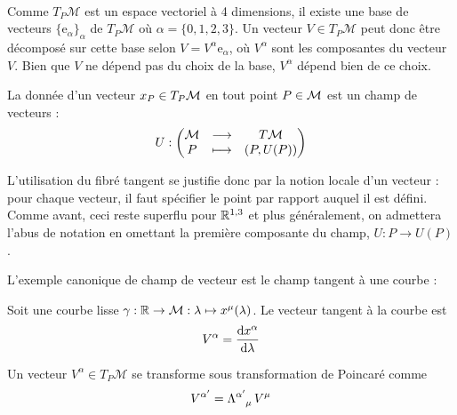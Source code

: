 {\begin{theoremframe}
\begin{defi}
\begin{align}
        \end{align}
    \end{defi}
\end{theoremframe}
Comme $T_P\mathcal{M}$ est un espace vectoriel à 4 dimensions, il existe une base de vecteurs $\{\mathrm{e}_\alpha\}_\alpha$ de $T_P\mathcal{M}$ où $\alpha = \{0,1,2,3\}$. Un vecteur $V \in T_P\mathcal{M}$ peut donc être décomposé sur cette base selon $V = V^\alpha \mathrm{e}_\alpha$, où $V^\alpha$ sont les composantes du vecteur $V$. Bien que $V$ ne dépend pas du choix de la base, $V^\alpha$ dépend bien de ce choix.
\begin{theoremframe}
    \begin{defi}
        La donnée d'un vecteur $x_P \in T_P\mathcal{M}$ en tout point $P \in \mathcal{M}$ est un champ de vecteurs :
        \begin{align*}
            U : \begin{pmatrix}
                \mathcal{M} & \longrightarrow& T\mathcal{M} \\
             P &\longmapsto&  (P,U(P))
            \end{pmatrix}
        \end{align*}
    \end{defi}
\end{theoremframe}
\begin{rmk}
    L'utilisation du fibré tangent se justifie donc par la notion locale d'un vecteur : pour chaque vecteur, il faut spécifier le point par rapport auquel il est défini. Comme avant, ceci reste superflu pour $\mathbb{R}^{1,3}$ et plus généralement, on admettera l'abus de notation en omettant la première composante du champ, $U: P \to U(P)$.
\end{rmk}
L'exemple canonique de champ de vecteur est le champ tangent à une courbe :
\begin{exmp}
    Soit une courbe lisse $\gamma :\mathbb{R} \to \mathcal{M}: \lambda \mapsto x^\mu (\lambda)$. Le vecteur tangent à la courbe est
    \begin{equation}
        V^\alpha = \frac{\mathrm{d} x^\alpha}{\mathrm{d} \lambda}
    \end{equation}
\end{exmp}
\begin{theoremframe}
\begin{propri}
    Un vecteur $V^\alpha\in T_P\mathcal{M}$ se transforme sous transformation de Poincaré comme
    \begin{equation}
        V^{\alpha'} = \Lambda\indices{^{\alpha'}_{\mu}} \, V^\mu
    \end{equation}

\end{propri}
\end{theoremframe}}
